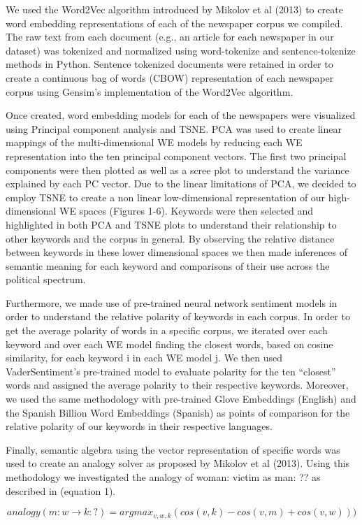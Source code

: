 \documentclass{article}
\begin{document}
{{We used the Word2Vec algorithm introduced by Mikolov et al (2013) to create word embedding representations of each of the newspaper corpus we compiled. The raw text from each document (e.g., an article for each newspaper in our dataset) was tokenized
and normalized using word-tokenize and sentence-tokenize methods in Python. Sentence tokenized documents were retained in order to create a continuous bag of words (CBOW) representation of each newspaper corpus using Gensim’s implementation of the Word2Vec algorithm.

Once created, word embedding models for each of the newspapers were visualized using Principal component analysis and TSNE. PCA was used to create linear mappings of the multi-dimensional WE models by reducing each WE representation into the ten principal component vectors. The first two principal components were then plotted as well as a scree plot to understand the variance explained by each PC vector. Due to the linear limitations of PCA, we decided to employ TSNE to create a non linear low-dimensional representation of our high-dimensional WE spaces (Figures 1-6). Keywords were then selected and highlighted in both PCA and TSNE plots to understand their relationship to other keywords and the corpus in general. By observing the relative distance between keywords in these lower dimensional spaces we then made inferences of semantic meaning for each keyword and comparisons of their use across the political spectrum.

Furthermore, we made use of pre-trained neural network sentiment models in order to understand the relative polarity of keywords in each corpus. In order to get the average polarity of words in a specific corpus, we iterated over each keyword and over each WE model finding the closest words,  based on cosine similarity, for each keyword i in each WE model j. We then used VaderSentiment’s pre-trained model to evaluate polarity for the ten “closest” words and assigned the average polarity to their respective keywords. Moreover, we used the same methodology with pre-trained Glove Embeddings (English) and the Spanish Billion Word Embeddings (Spanish) as points of comparison for the relative polarity of our keywords in their respective languages. 

Finally, semantic algebra using the vector representation of specific words was used to create an analogy solver as proposed by Mikolov et al (2013). Using this methodology we investigated the analogy of woman: victim as man: ?? as described in (equation 1). 

\begin{equation} \label{eu_eqn}
	analogy(m:w \rightarrow k:?) = argmax_{v,w,k}(cos(v,k)-cos(v,m)+cos(v,w)))
\end{equation}

}
	
}
\newpage
\end{document}
